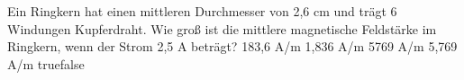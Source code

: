     {Ein Ringkern hat einen mittleren Durchmesser von 2,6 cm und trägt 6 Windungen Kupferdraht. Wie groß ist die mittlere magnetische Feldstärke im Ringkern, wenn der Strom 2,5 A beträgt?}
    {183,6 A/m}
    {1,836 A/m}
    {5769 A/m}
    {5,769 A/m}
    {true}{false}
